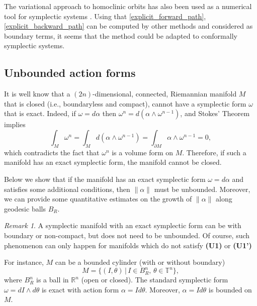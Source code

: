 \documentclass[11pt]{amsart}
\theoremstyle{definition}
\theoremstyle{remark}
\newtheorem{rem}[thm]{Remark}
\numberwithin{equation}{section}
\newcommand{\R}{\mathbb R}
\newcommand{\T}{\mathbb T}
\begin{document}
The variational approach to homoclinic orbits has also been used
as a numerical tool for symplectic  systems
\cite{Tabacman95,MacKayMS89}.
Using that
\eqref{explicit_forward_path}, \eqref{explicit_backward_path}
can be computed by other methods and
considered as boundary terms, it seems that the method could
be adapted to conformally symplectic systems.







\subsection{Unbounded  action forms}
\label{sec:unbounded_action}
It is well know that a $(2n)$-dimensional, connected, Riemannian manifold  $M$ that is closed (i.e., boundaryless and compact), cannot have a symplectic form $\omega$ that is exact.
  Indeed, if $\omega = d\alpha$ then
    $\omega^n = d(\alpha \wedge \omega^{n-1})$, and Stokes' Theorem  implies
    \begin{equation}\label{identity}
    \int_M \omega^n =  \int_M d(\alpha \wedge \omega^{n-1})
    = \int_{\partial M} \alpha \wedge \omega^{n-1} = 0 ,
    \end{equation}
    which contradicts the fact that $\omega^n$ is a volume form on $M$.
Therefore, if such a  manifold  has an exact symplectic form, the manifold cannot be closed.


\medskip



Below we show that if the  manifold has an exact symplectic form $\omega=d\alpha$ and satisfies some additional conditions, then $\|\alpha\|$ must be unbounded. Moreover, we can provide some quantitative estimates on the growth of $\|\alpha\|$ along geodesic balls $B_R$.


\begin{rem}\label{ex:noncompact_bounded}
  A symplectic manifold with an exact symplectic form can be with boundary or non-compact, but does not need to be unbounded. Of course, such phenomenon can only happen for manifolds
  which do not satisfy {\bf (U1)} or {\bf (U1')}

For instance, $M$  can be a bounded cylinder (with or without boundary)
\[M=\{(I,\theta)\,|\, I \in  B^n_R,\, \theta\in \T^n\},\]
where $B^n_R$ is a ball in $\R^n$ (open or closed).
The standard symplectic form $\omega=dI\wedge d\theta$ is exact with action form $\alpha=I d\theta$.
Moreover, $\alpha=I d\theta$ is bounded on $M$.

\end{rem}
\end{document}
